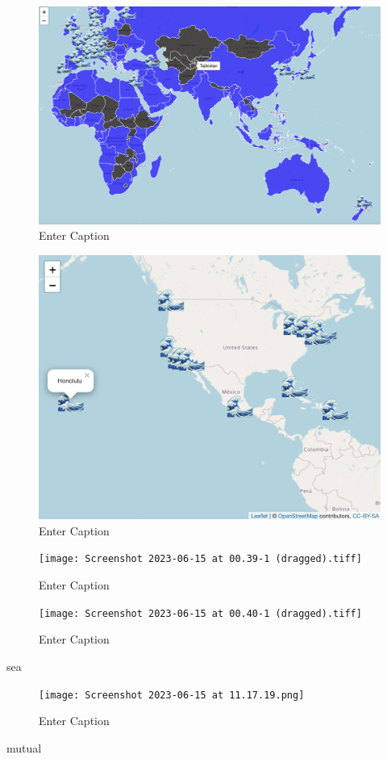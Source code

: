 \documentclass[a4paper, twoside, 12pt]{book}
\begin{document}
\begin{figure}
    \centering
    \includegraphics[width=0.5\linewidth]{Screenshot 2023-06-15 at 00.25.20.png}
    \caption{Enter Caption}
    \label{fig:enter-label}
\end{figure}

\begin{figure}
    \centering
    \includegraphics[width=0.5\linewidth]{ocean city names.png}
    \caption{Enter Caption}
    \label{fig:enter-label}
\end{figure}

\begin{figure}
    \centering
    \texttt{[image: Screenshot 2023-06-15 at 00.39-1 (dragged).tiff]}
    \caption{Enter Caption}
    \label{fig:enter-label}
\end{figure}
\begin{figure}
    \centering
    \texttt{[image: Screenshot 2023-06-15 at 00.40-1 (dragged).tiff]}
    \caption{Enter Caption}
    \label{fig:enter-label}
\end{figure}

sea\\

\begin{figure}
    \centering
    \texttt{[image: Screenshot 2023-06-15 at 11.17.19.png]}
    \caption{Enter Caption}
    \label{fig:enter-label}
\end{figure}
mutual\\
\end{document}
